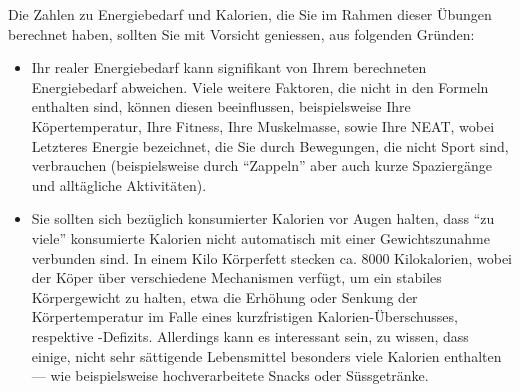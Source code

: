 \begin{mycaution}
	Die Zahlen zu Energiebedarf und Kalorien, die Sie im Rahmen dieser Übungen berechnet haben, sollten Sie mit Vorsicht geniessen, aus folgenden Gründen:
	\begin{itemize}
		\item Ihr realer Energiebedarf kann signifikant von Ihrem berechneten Energiebedarf abweichen. Viele weitere Faktoren, die nicht in den Formeln enthalten sind, können diesen beeinflussen, beispielsweise Ihre Köpertemperatur, Ihre Fitness, Ihre Muskelmasse, sowie Ihre \gls{NEAT}, wobei Letzteres Energie bezeichnet, die Sie durch Bewegungen, die nicht Sport sind, verbrauchen (beispielsweise durch ``Zappeln'' aber auch kurze Spaziergänge und alltägliche Aktivitäten).
		\item Sie sollten sich bezüglich konsumierter Kalorien vor Augen halten, dass ``zu viele'' konsumierte Kalorien nicht automatisch mit einer Gewichtszunahme verbunden sind. In einem Kilo Körperfett stecken ca. 8000 Kilokalorien, wobei der Köper über verschiedene Mechanismen verfügt, um ein stabiles Körpergewicht zu halten, etwa die Erhöhung oder Senkung der Körpertemperatur im Falle eines kurzfristigen Kalorien-Überschusses, respektive -Defizits. Allerdings kann es interessant sein, zu wissen, dass einige, nicht sehr sättigende Lebensmittel besonders viele Kalorien enthalten –– wie beispielsweise hochverarbeitete Snacks oder Süssgetränke.
	\end{itemize}
\end{mycaution}
